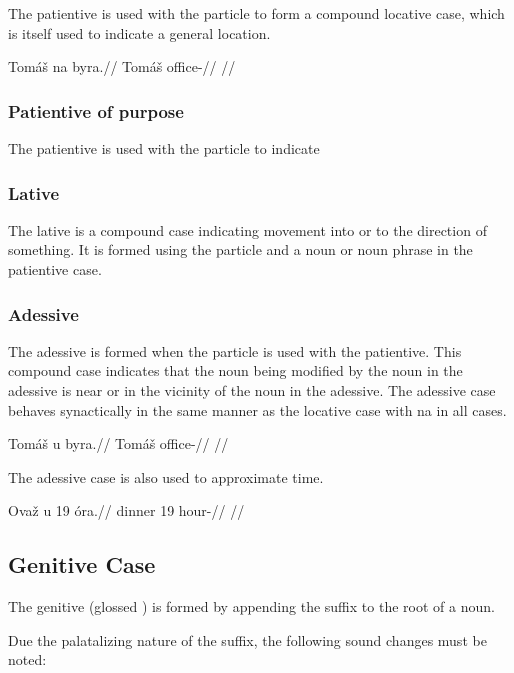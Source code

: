 The patientive is used with the particle  to form a compound locative case, which is itself used to indicate a general location.

\pex
\begingl
\gla Tomáš na byra.//
\glb Tomáš \Loc{} office-\Acc{}//
\glft {}//
\endgl
\xe

\subsubsection{Patientive of purpose}

The patientive is used with the particle  to indicate

\subsubsection{Lative}
The lative is a compound case indicating movement into or to the direction of something. It is formed using the particle  and a noun or noun phrase in the patientive case.

\subsubsection{Adessive}
The adessive is formed when the particle  is used with the patientive. This compound case indicates that the noun being modified by the noun in the adessive is near or in the vicinity of the noun in the adessive. The adessive case behaves synactically in the same manner as the locative case with na in all cases.

\pex
\begingl
\gla Tomáš u byra.//
\glb Tomáš \Ade{} office-\Acc{}//
\glft {}//
\endgl
\xe

The adessive case is also used to approximate time.

\pex
\begingl
\gla Ovaž u 19 óra.//
\glb dinner \Ade{} 19 hour-\Acc{}//
\glft {}//
\endgl
\xe

\subsection{Genitive Case}

The genitive (glossed \Gen{}) is formed by appending the suffix  to the root of a noun.

Due the palatalizing nature of the suffix, the following sound changes must be noted:

